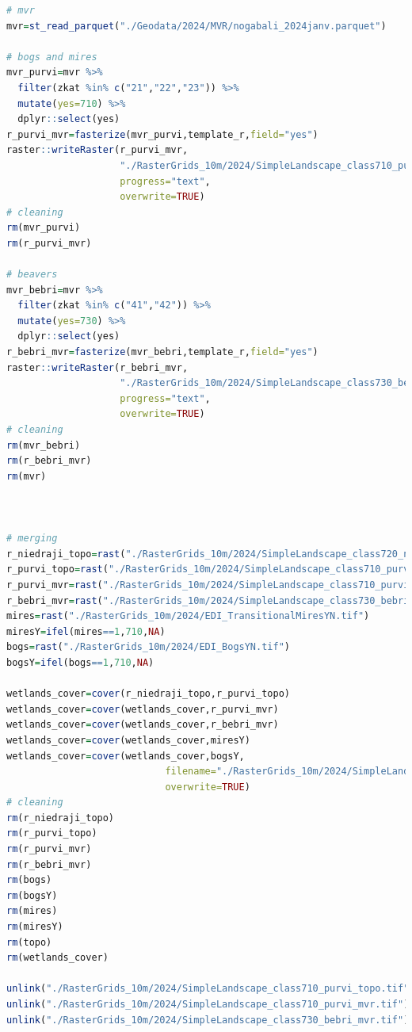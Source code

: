 \documentclass[
]{book}
\begin{document}
\begin{lstlisting}[language=R]
# mvr
mvr=st_read_parquet("./Geodata/2024/MVR/nogabali_2024janv.parquet")

# bogs and mires
mvr_purvi=mvr %>% 
  filter(zkat %in% c("21","22","23")) %>% 
  mutate(yes=710) %>% 
  dplyr::select(yes)
r_purvi_mvr=fasterize(mvr_purvi,template_r,field="yes")
raster::writeRaster(r_purvi_mvr,
                    "./RasterGrids_10m/2024/SimpleLandscape_class710_purvi_mvr.tif",
                    progress="text",
                    overwrite=TRUE)
# cleaning
rm(mvr_purvi)
rm(r_purvi_mvr)

# beavers
mvr_bebri=mvr %>% 
  filter(zkat %in% c("41","42")) %>% 
  mutate(yes=730) %>% 
  dplyr::select(yes)
r_bebri_mvr=fasterize(mvr_bebri,template_r,field="yes")
raster::writeRaster(r_bebri_mvr,
                    "./RasterGrids_10m/2024/SimpleLandscape_class730_bebri_mvr.tif",
                    progress="text",
                    overwrite=TRUE)
# cleaning
rm(mvr_bebri)
rm(r_bebri_mvr)
rm(mvr)



# merging
r_niedraji_topo=rast("./RasterGrids_10m/2024/SimpleLandscape_class720_niedraji_topo.tif")
r_purvi_topo=rast("./RasterGrids_10m/2024/SimpleLandscape_class710_purvi_topo.tif")
r_purvi_mvr=rast("./RasterGrids_10m/2024/SimpleLandscape_class710_purvi_mvr.tif")
r_bebri_mvr=rast("./RasterGrids_10m/2024/SimpleLandscape_class730_bebri_mvr.tif")
mires=rast("./RasterGrids_10m/2024/EDI_TransitionalMiresYN.tif")
miresY=ifel(mires==1,710,NA)
bogs=rast("./RasterGrids_10m/2024/EDI_BogsYN.tif")
bogsY=ifel(bogs==1,710,NA)

wetlands_cover=cover(r_niedraji_topo,r_purvi_topo)
wetlands_cover=cover(wetlands_cover,r_purvi_mvr)
wetlands_cover=cover(wetlands_cover,r_bebri_mvr)
wetlands_cover=cover(wetlands_cover,miresY)
wetlands_cover=cover(wetlands_cover,bogsY,
                            filename="./RasterGrids_10m/2024/SimpleLandscape_class700_mitraji_premask.tif",
                            overwrite=TRUE)
# cleaning
rm(r_niedraji_topo)
rm(r_purvi_topo)
rm(r_purvi_mvr)
rm(r_bebri_mvr)
rm(bogs)
rm(bogsY)
rm(mires)
rm(miresY)
rm(topo)
rm(wetlands_cover)

unlink("./RasterGrids_10m/2024/SimpleLandscape_class710_purvi_topo.tif")
unlink("./RasterGrids_10m/2024/SimpleLandscape_class710_purvi_mvr.tif")
unlink("./RasterGrids_10m/2024/SimpleLandscape_class730_bebri_mvr.tif")
\end{lstlisting}
\end{document}
